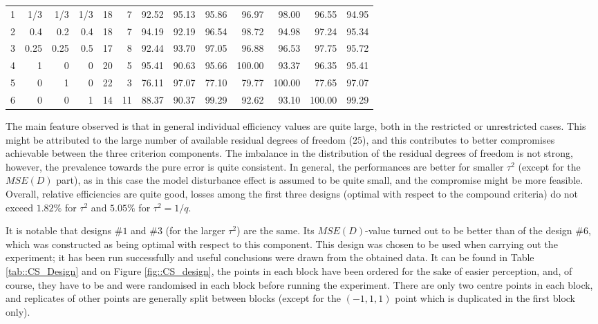 \begin{table}[h]
{\begin{tabular}{rrrrrrrrrrrrc}
1 & 1/3 & 1/3 & 1/3 & \multicolumn{1}{|r}{18} & \multicolumn{1}{r|}{7} & 92.52 & 95.13 & 95.86 & \multicolumn{1}{|r}{96.97} & 98.00 & \multicolumn{1}{r|}{96.55} & 94.95 \\
2 & 0.4 & 0.2 & 0.4 & \multicolumn{1}{|r}{18} & \multicolumn{1}{r|}{7} & 94.19 & 92.19 & 96.54 & \multicolumn{1}{|r}{98.72} & 94.98 & \multicolumn{1}{r|}{97.24} & 95.34 \\
3 & 0.25 & 0.25 & 0.5 & \multicolumn{1}{|r}{17} & \multicolumn{1}{r|}{8} & 92.44 & 93.70 & 97.05 & \multicolumn{1}{|r}{96.88} & 96.53 & \multicolumn{1}{r|}{97.75} & 95.72 \\
4 & 1 & 0 & 0 & \multicolumn{1}{|r}{20} & \multicolumn{1}{r|}{5} & 95.41 & 90.63 & 95.66 & \multicolumn{1}{|r}{100.00} & 93.37 & \multicolumn{1}{r|}{96.35} & 95.41 \\
5 & 0 & 1 & 0 & \multicolumn{1}{|r}{22} & \multicolumn{1}{r|}{3} & 76.11 & 97.07 & 77.10 & \multicolumn{1}{|r}{79.77} & 100.00 & \multicolumn{1}{r|}{77.65} & 97.07 \\
6 & 0 & 0 & 1 & \multicolumn{1}{|r}{14} & \multicolumn{1}{r|}{11} & 88.37 & 90.37 & 99.29 & \multicolumn{1}{|r}{92.62} & 93.10 & \multicolumn{1}{r|}{100.00} & 99.29
\end{tabular}
}
\end{table}

The main feature observed is that in general individual efficiency values are quite large, both in the restricted or unrestricted cases. This might be attributed to the large number of available residual degrees of freedom ($25$), and this contributes to better compromises achievable between the three criterion components. The imbalance in the distribution of the residual degrees of freedom is not strong, however, the prevalence towards the pure error is quite consistent. 
In general, the performances are better for smaller $\tau^2$ (except for the $MSE(D)$ part), as in this case the model disturbance effect is assumed to be quite small, and the compromise might be more feasible. Overall, relative efficiencies are quite good, losses among the first three designs (optimal with respect to the compound criteria) do not exceed $1.82\%$ for $\tau^2$ and $5.05\%$ for $\tau^2=1/q$.

It is notable that designs \#$1$ and \#$3$ (for the larger $\tau^2$) are the same. Its $MSE(D)$-value turned out to be better than of the design \#$6$, which was constructed as being optimal with respect to this component. This design was chosen to be used when carrying out the experiment; it has been run successfully and useful conclusions were drawn from the obtained data. It can be found in Table \ref{tab::CS_Design} and on Figure \ref{fig::CS_design}, the points in each block have been ordered for the sake of easier perception, and, of course, they have to be and were randomised in each block before running the experiment. There are only two centre points in each block, and replicates of other points are generally split between blocks (except for the $(-1,1,1)$ point which is duplicated in the first block only).

